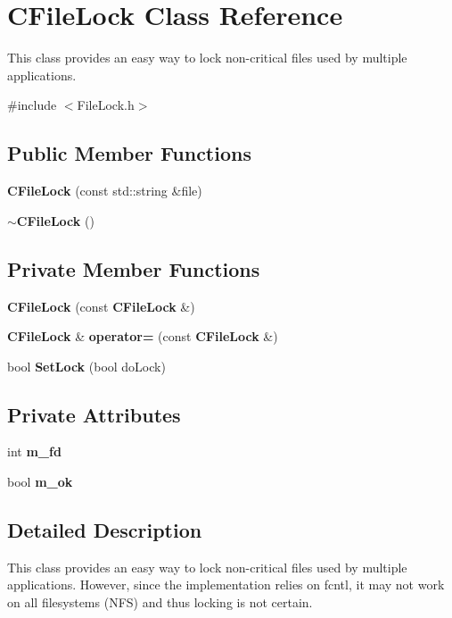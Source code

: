 \section{CFileLock Class Reference}
\label{classCFileLock}


This class provides an easy way to lock non-\/critical files used by multiple applications.  


{\ttfamily \#include $<$FileLock.h$>$}\subsection*{Public Member Functions}
\begin{DoxyCompactItemize}
\item 
{\bf CFileLock} (const std::string \&file)
\item 
{\bf $\sim$CFileLock} ()
\end{DoxyCompactItemize}
\subsection*{Private Member Functions}
\begin{DoxyCompactItemize}
\item 
{\bf CFileLock} (const {\bf CFileLock} \&)\label{classCFileLock_afa73d15e526f02fc0d48e7d3137ff71d}

\item 
{\bf CFileLock} \& {\bf operator=} (const {\bf CFileLock} \&)\label{classCFileLock_a5d9d644831dc212aac03984097246d6b}

\item 
bool {\bf SetLock} (bool doLock)
\end{DoxyCompactItemize}
\subsection*{Private Attributes}
\begin{DoxyCompactItemize}
\item 
int {\bf m\_\-fd}\label{classCFileLock_a52a94a76288b8683eb60b11ad0f58edc}

\item 
bool {\bf m\_\-ok}\label{classCFileLock_ae6a5b35f997a69422c8f944c5aa95276}

\end{DoxyCompactItemize}


\subsection{Detailed Description}
This class provides an easy way to lock non-\/critical files used by multiple applications. However, since the implementation relies on fcntl, it may not work on all filesystems (NFS) and thus locking is not certain.

